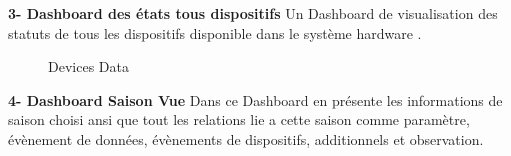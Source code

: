 \textbf{3-  Dashboard des états tous dispositifs}
\newline
Un Dashboard de visualisation des statuts de tous les dispositifs disponible dans le système hardware .
\begin{figure}[hbt]
\centering
\right
\label{fig: Devices Data }

  \caption{Devices Data}
\end{figure}

\textbf{4-  Dashboard Saison Vue}
\newline
Dans ce Dashboard en présente  les informations de saison choisi ansi que tout \newline les relations lie a cette saison comme paramètre, évènement de données, évènements de dispositifs, additionnels et observation.

